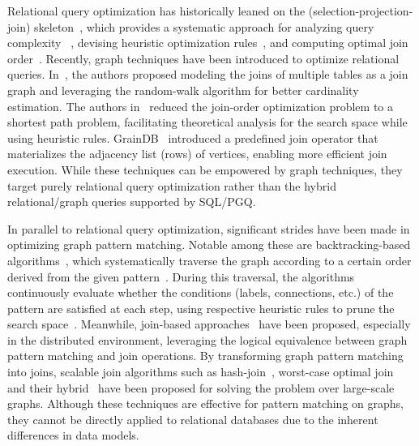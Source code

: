 Relational query optimization has historically leaned on the \spj (selection-projection-join) skeleton~\cite{spj,Chaudhuri98}, which provides a systematic approach for analyzing query complexity~\cite{IbarakiK84,ChatterjiEGY02} , devising heuristic optimization rules~\cite{Chaudhuri99heuristics,goldsteinheuristics}, and
computing optimal join order~\cite{Haffnerjoinorder,chenjoinorder}. Recently, graph techniques have been introduced to optimize relational queries. In~\cite{wanderjoin}, the authors proposed modeling the joins of multiple tables as a join graph and leveraging the random-walk algorithm for better cardinality estimation. The authors in~\cite{Haffnerjoinorder} reduced the join-order optimization problem to a shortest path problem, facilitating theoretical analysis for the search space while using heuristic rules. GrainDB~\cite{graindb} introduced a predefined join operator that materializes the adjacency list (rows) of vertices, enabling more efficient join execution. While these techniques can be empowered by graph techniques, they target purely relational query optimization rather than the hybrid relational/graph queries supported by SQL/PGQ.

In parallel to relational query optimization, significant strides have been made in optimizing graph pattern matching. Notable among these are backtracking-based algorithms~\cite{ullmann1976algorithm}, which systematically traverse the graph according to a certain order derived from the given pattern~\cite{han13turbo,bi2016efficient}. During this traversal, the algorithms continuously evaluate whether the conditions (labels, connections, etc.) of the pattern are satisfied at each step, using respective heuristic rules to prune the search space~\cite{shang2008quicksi,han13turbo,bi2016efficient}. Meanwhile, join-based approaches~\cite{lai2019distributed,lai2015scalable,ammar2018distributed,huge} have been proposed, especially in the distributed environment,
leveraging the logical equivalence between graph pattern matching and join operations.
By transforming graph pattern matching into joins, scalable join algorithms such as hash-join~\cite{lai2015scalable}, worst-case optimal join~\cite{ammar2018distributed} and their hybrid~\cite{mhedhbi2019optimizing,huge} have been proposed for solving the problem over large-scale graphs. Although these techniques are effective for pattern matching on graphs, they cannot be directly applied to relational databases due to the inherent differences in data models.

